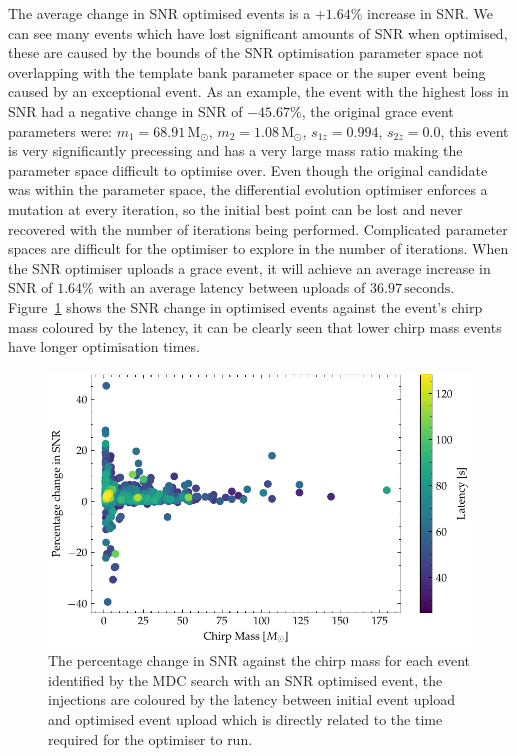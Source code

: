 %
The average change in SNR optimised events is a $+1.64\%$ increase in SNR. We can see many events which have lost significant amounts of SNR when optimised, these are caused by the bounds of the SNR optimisation parameter space not overlapping with the template bank parameter space or the super event being caused by an exceptional event. As an example, the event with the highest loss in SNR had a negative change in SNR of $-45.67\%$, the original grace event parameters were: $m_{1} = 68.91 \, \text{M}_{\odot}$, $m_{2} = 1.08 \, \text{M}_{\odot}$, $s_{1z} = 0.994$, $s_{2z} = 0.0$, this event is very significantly precessing and has a very large mass ratio making the parameter space difficult to optimise over. Even though the original candidate was within the parameter space, the differential evolution optimiser enforces a mutation at every iteration, so the initial best point can be lost and never recovered with the number of iterations being performed. Complicated parameter spaces are difficult for the optimiser to explore in the number of iterations. When the SNR optimiser uploads a grace event, it will achieve an average increase in SNR of $1.64\%$ with an average latency between uploads of $36.97 \, \text{seconds}$. Figure~\ref{7:fig:mchirp_latency_diff} shows the SNR change in optimised events against the event's chirp mass coloured by the latency, it can be clearly seen that lower chirp mass events have longer optimisation times.
%
\begin{figure}
    \centering
    \includegraphics[width=1.0\linewidth]{images/7_snr_optimiser/mchirp_snr_diff.pdf}
    \caption{The percentage change in SNR against the chirp mass for each \gwadj event identified by the MDC search with an SNR optimised event, the injections are coloured by the latency between initial event upload and optimised event upload which is directly related to the time required for the optimiser to run.}
    \label{7:fig:mchirp_latency_diff}
\end{figure}
%

